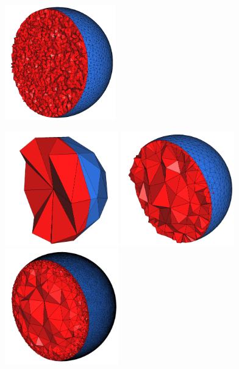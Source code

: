 \begin{figure}[ht]
\begin{center}
 \begin{ccTexOnly}
   \includegraphics[height=5cm]{Mesh_3/pictures/implicit_domain}

   \includegraphics[height=5cm]{Mesh_3/pictures/implicit_domain_3}
   \includegraphics[height=5cm]{Mesh_3/pictures/implicit_domain_4}
   \includegraphics[height=5cm]{Mesh_3/pictures/implicit_domain_5}
 \end{ccTexOnly}
 \begin{ccHtmlOnly}

\end{ccHtmlOnly}
\end{center}
\end{figure}
